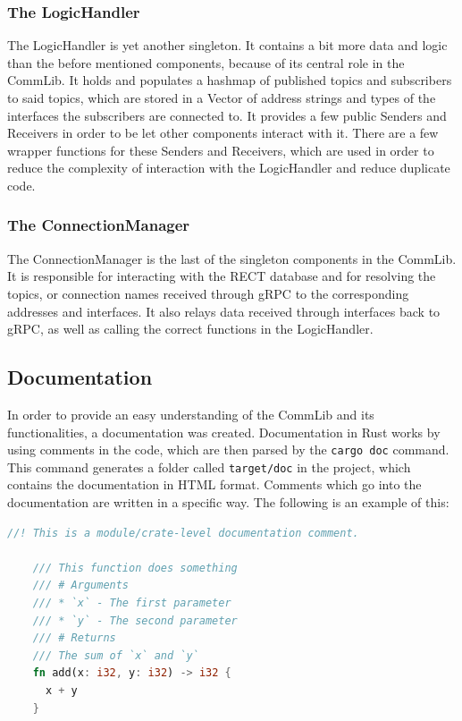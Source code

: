 \subsubsection{The LogicHandler}
The LogicHandler is yet another singleton. It contains a bit more data and logic than the before mentioned components, because of its central role in the CommLib.
It holds and populates a hashmap of published topics and subscribers to said topics, which are stored in a Vector of address strings and types of the interfaces the
subscribers are connected to. It provides a few public Senders and Receivers in order to be let other components interact with it. There are a few wrapper functions
for these Senders and Receivers, which are used in order to reduce the complexity of interaction with the LogicHandler and reduce duplicate code.

\subsubsection{The ConnectionManager}
The ConnectionManager is the last of the singleton components in the CommLib. It is responsible for interacting with the RECT database and for resolving the topics, or connection
names received through gRPC to the corresponding addresses and interfaces. It also relays data received through interfaces back to gRPC, as well as
calling the correct functions in the LogicHandler.



\subsection{Documentation}
In order to provide an easy understanding of the CommLib and its functionalities, a documentation was created.
Documentation in Rust works by using comments in the code, which are then parsed by the \verb+cargo doc+ command. 
This command generates a folder called \verb+target/doc+ in the project, which contains the documentation in HTML format.
Comments which go into the documentation are written in a specific way.
The following is an example of this: 

\begin{minipage}{\textwidth}
  \begin{lstlisting}[language=Rust, caption=Example of a Documentation Comment]
    //! This is a module/crate-level documentation comment.

    /// This function does something
    /// # Arguments
    /// * `x` - The first parameter
    /// * `y` - The second parameter
    /// # Returns
    /// The sum of `x` and `y`
    fn add(x: i32, y: i32) -> i32 {
      x + y
    }
  \end{lstlisting}
\end{minipage}

